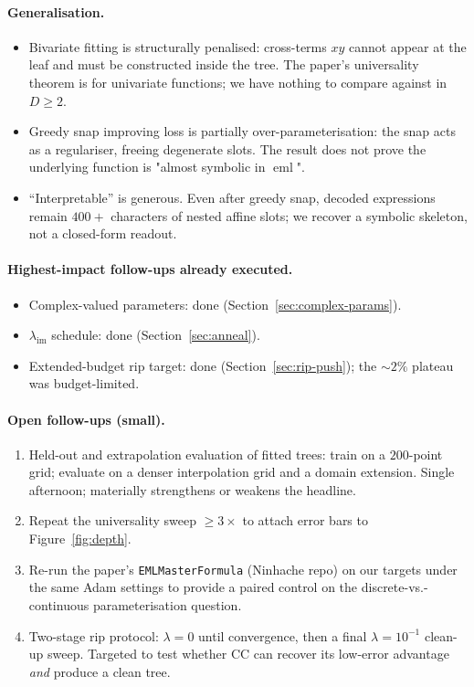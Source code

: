 \documentclass[11pt]{article}
\newcommand{\eml}{\operatorname{eml}}
\begin{document}
\paragraph{Generalisation.}
\begin{itemize}
\item Bivariate fitting is structurally penalised: cross-terms $xy$ cannot
  appear at the leaf and must be constructed inside the tree. The paper's
  universality theorem is for univariate functions; we have nothing to compare
  against in $D \geq 2$.
\item Greedy snap improving loss is partially over-parameterisation: the
  snap acts as a regulariser, freeing degenerate slots. The result does not
  prove the underlying function is "almost symbolic in $\eml$".
\item ``Interpretable'' is generous. Even after greedy snap, decoded
  expressions remain $400+$ characters of nested affine slots; we recover a
  symbolic skeleton, not a closed-form readout.
\end{itemize}

\paragraph{Highest-impact follow-ups already executed.}
\begin{itemize}
\item Complex-valued parameters: done (Section~\ref{sec:complex-params}).
\item $\lambda_{\mathrm{im}}$ schedule: done (Section~\ref{sec:anneal}).
\item Extended-budget rip target: done (Section~\ref{sec:rip-push}); the
  $\sim 2\%$ plateau was budget-limited.
\end{itemize}

\paragraph{Open follow-ups (small).}
\begin{enumerate}
\item Held-out and extrapolation evaluation of fitted trees: train on a
  $200$-point grid; evaluate on a denser interpolation grid and a domain
  extension. Single afternoon; materially strengthens or weakens the
  headline.
\item Repeat the universality sweep $\geq 3 \times$ to attach error bars to
  Figure~\ref{fig:depth}.
\item Re-run the paper's \texttt{EMLMasterFormula} (Ninhache repo) on our
  targets under the same Adam settings to provide a paired control on the
  discrete-vs.-continuous parameterisation question.
\item Two-stage rip protocol: $\lambda{=}0$ until convergence, then a final
  $\lambda{=}10^{-1}$ clean-up sweep. Targeted to test whether CC can
  recover its low-error advantage \emph{and} produce a clean tree.
\end{enumerate}
\end{document}

